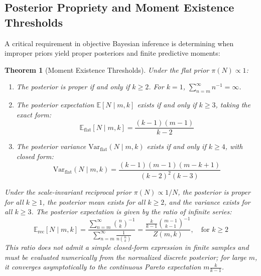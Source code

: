 \documentclass[10pt,a4paper]{article}
\newtheorem{theorem}{Theorem}
\begin{document}
\subsection{Posterior Propriety and Moment Existence Thresholds}
A critical requirement in objective Bayesian inference is determining when improper priors yield proper posteriors and finite predictive moments:

\begin{theorem}[Moment Existence Thresholds]
Under the flat prior $\pi(N) \propto 1$:
\begin{enumerate}
    \item The posterior is proper if and only if $k \ge 2$. For $k = 1$, $\sum_{n=m}^\infty n^{-1} = \infty$.
    \item The posterior expectation $\mathbb{E}[N \mid m, k]$ exists if and only if $k \ge 3$, taking the exact form:
    \begin{equation}
    \mathbb{E}_{\text{flat}}[N \mid m, k] = \frac{(k - 1)(m - 1)}{k - 2}
    \label{eq:flat_mean}
    \end{equation}
    \item The posterior variance $\text{Var}_{\text{flat}}(N \mid m, k)$ exists if and only if $k \ge 4$, with closed form:
    \begin{equation}
    \text{Var}_{\text{flat}}(N \mid m, k) = \frac{(k - 1)(m - 1)(m - k + 1)}{(k - 2)^2 (k - 3)}
    \label{eq:flat_var}
    \end{equation}
\end{enumerate}
Under the scale-invariant reciprocal prior $\pi(N) \propto 1/N$, the posterior is proper for all $k \ge 1$, the posterior mean exists for all $k \ge 2$, and the variance exists for all $k \ge 3$. The posterior expectation is given by the ratio of infinite series:
\begin{equation}
\mathbb{E}_{\text{rec}}[N \mid m, k] = \frac{\sum_{n=m}^\infty \binom{n}{k}^{-1}}{\sum_{n=m}^\infty \frac{1}{n\binom{n}{k}}} = \frac{\frac{k}{k-1}\binom{m-1}{k-1}^{-1}}{Z(m, k)}, \quad \text{for } k \ge 2
\label{eq:reciprocal_mean_series}
\end{equation}
This ratio does not admit a simple closed-form expression in finite samples and must be evaluated numerically from the normalized discrete posterior; for large $m$, it converges asymptotically to the continuous Pareto expectation $m \frac{k}{k-1}$.
\end{theorem}
\end{document}
